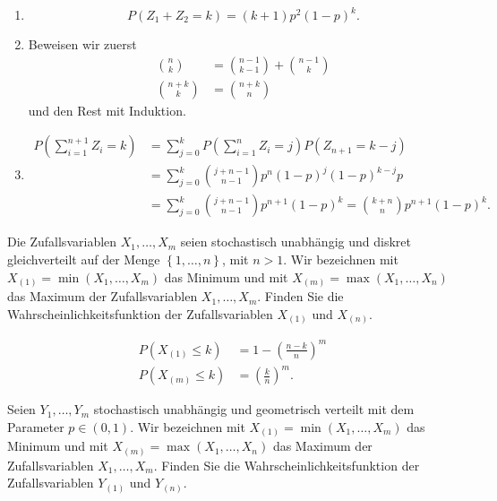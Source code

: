 \solution
\begin{enumerate}
    \item \begin{equation*}
            P\left( Z_1+Z_2 = k \right) = (k+1)p^{2}(1-p)^k.
        \end{equation*}
    \item Beweisen wir zuerst
        \begin{align*}
            \binom{n}{k} &= \binom{n-1}{k-1} + \binom{n-1}{k} \\
            \binom{n+k}{k} &= \binom{n+k}{n}
        \end{align*}
        und den Rest mit Induktion.
    \item \begin{align*}
            P\left( \sum_{i=1}^{n+1} Z_i = k \right) &= 
            \sum_{j=0}^{k} P\left( \sum_{i=1}^{n} Z_i = j \right) P\left( Z_{n+1} =k-j \right) \\
            &= \sum_{j=0}^{k} \binom{j+n-1}{n-1} p^{n}(1-p)^{j} (1-p)^{k-j}p \\
            &= \sum_{j=0}^{k} \binom{j+n-1}{n-1} p^{n+1}(1-p)^{k} = \binom{k+n}{n} p^{n+1}(1-p)^{k}. 
        \end{align*}
\end{enumerate}


 Die Zufallsvariablen
$X_1,\dots ,X_m$ seien stochastisch unabhängig und diskret gleichverteilt auf der Menge
$\left\{ 1,\dots ,n \right\}$, mit $n>1$. Wir bezeichnen mit $X_{(1)} = \min
(X_1,\dots ,X_m)$ das Minimum und mit $X_{(m)} = \max \left( X_1,\dots ,X_n
\right)$ das Maximum der Zufallsvariablen $X_1,\dots ,X_m$.
Finden Sie die Wahrscheinlichkeitsfunktion der Zufallsvariablen
        $X_{(1)}$ und $X_{(n)}$.

\solution
\begin{align*}
    P\left( X_{(1)} \leq k \right) &= 1 - \left( \frac{n-k}{n} \right)^m \\
    P\left( X_{(m)} \leq k \right) &= \left( \frac{k}{n} \right)^{m}. 
\end{align*}


 Seien $Y_1,\dots ,Y_m$
stochastisch unabhängig und geometrisch verteilt mit dem Parameter $p\in(0,1)$.
Wir bezeichnen mit $X_{(1)} = \min (X_1,\dots ,X_m)$ das Minimum und mit
$X_{(m)} = \max \left( X_1,\dots ,X_n \right)$ das Maximum der Zufallsvariablen
$X_1,\dots ,X_m$.  Finden Sie die Wahrscheinlichkeitsfunktion der
Zufallsvariablen $Y_{(1)}$ und $Y_{(n)}$.

